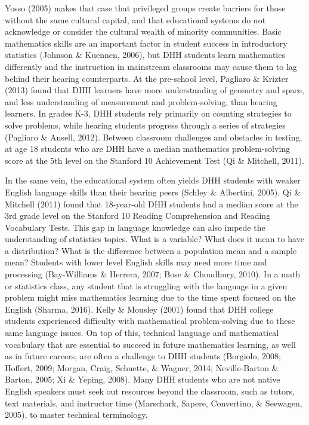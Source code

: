 \documentclass[11.5pt]{sig-alternate} %
\begin{document}
\begin{large}
Yosso (2005) makes that case that privileged groups create barriers for those without the same cultural capital, and that educational systems do not acknowledge or consider the cultural wealth of minority communities. Basic mathematics skills are an important factor in student success in introductory statistics (Johnson \& Kuennen, 2006), but DHH students learn mathematics differently and the instruction in mainstream classrooms may cause them to lag behind their hearing counterparts. At the pre-school level, Pagliaro \& Krizter (2013) found that DHH learners have more understanding of geometry and space, and less understanding of measurement and problem-solving, than hearing learners. In grades K-3, DHH students rely primarily on counting strategies to solve problems, while hearing students progress through a series of strategies (Pagliaro \& Ansell, 2012). Between classroom challenges and obstacles in testing, at age 18 students who are DHH have a median mathematics problem-solving score at the 5th level on the Stanford 10 Achievement Test (Qi \& Mitchell, 2011).

In the same vein, the educational system often yields DHH students with weaker English language skills than their hearing peers (Schley \& Albertini, 2005). Qi \& Mitchell (2011) found that 18-year-old DHH students had a median score at the 3rd grade level on the Stanford 10 Reading Comprehension and Reading Vocabulary Tests. This gap in language knowledge can also impede the understanding of statistics topics. What is a variable? What does it mean to have a distribution? What is the difference between a population mean and a sample mean? Students with lower level English skills may need more time and processing (Bay-Williams \& Herrera, 2007; Bose \& Choudhury, 2010). In a math or statistics class, any student that is struggling with the language in a given problem might miss mathematics learning due to the time spent focused on the English (Sharma, 2016). Kelly \& Mousley (2001) found that DHH college students experienced difficulty with mathematical problem-solving due to these same language issues. On top of this, technical language and mathematical vocabulary that are essential to succeed in future mathematics learning, as well as in future careers, are often a challenge to DHH students (Borgiolo, 2008; Hoffert, 2009; Morgan, Craig, Schuette, \& Wagner, 2014; Neville-Barton \& Barton, 2005; Xi \& Yeping, 2008). Many DHH students who are not native English speakers must seek out resources beyond the classroom, such as tutors, text materials, and instructor time (Marschark, Sapere, Convertino, \& Seewagen, 2005), to master technical terminology.


\end{large}
\end{document}
